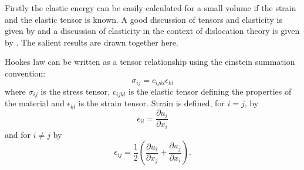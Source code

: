 Firstly the elastic energy can be easily calculated for a small volume if the strain and the elastic tensor is known. A good discussion of tensors and elasticity is given by \citet{kelly_knowles2012chapter5_tensors,kelly_knowles2012chapter6_stress_strain} and a discussion of elasticity in the context of dislocation theory is given by \citet{hirth_lothe1982elasticity}. The salient results are drawn together here.

Hookes law can be written as a tensor relationship using the einstein summation convention:
\begin{equation}
\sigma_{ij} = c_{ijkl} \epsilon_{kl}
\end{equation}
where $\sigma_{ij}$ is the stress tensor, $c_{ijkl}$ is the elastic tensor defining the properties of the material and $\epsilon_{kl}$ is the strain tensor. Strain is defined, for $i=j$, by
\begin{equation}
\epsilon_{ii} = \frac{\partial u_i}{\partial x_i}
\end{equation}
and for $i\neq j$ by
\begin{equation}
\epsilon_{ij} = \frac{1}{2} \left( \frac{\partial u_i}{\partial x_j} + \frac{\partial u_j}{\partial x_i} \right).
\end{equation}
